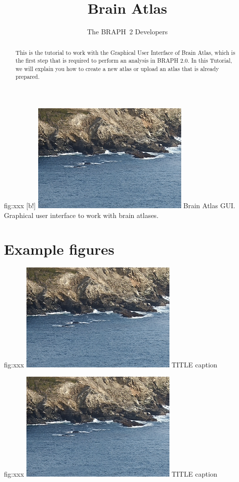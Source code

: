 \documentclass{tufte-handout}
\title{Brain Atlas}
\author[The BRAPH~2 Developers]{The BRAPH~2 Developers}
\begin{document}
\maketitle

	{fig:xxx}
	{
	[b!]
	\includegraphics{tut_ba/fig1.png}
	}
	{Brain Atlas GUI.}
	{
	Graphical user interface to work with brain atlases. 
	}
	
\begin{abstract}
\noindent
This is the tutorial to work with the Graphical User Interface of Brain Atlas, which is the first step that is required to perform an analysis in BRAPH 2.0. 
In this Tutorial, we will explain you how to create a new atlas or upload an atlas that is already prepared.
\end{abstract}

\clearpage
\section{Example figures}

	{fig:xxx}
	{\includegraphics{tut_ba/fig1.png}}
	{TITLE}
	{
	caption
	}

	{fig:xxx}
	{\includegraphics{tut_ba/fig1.png}}
	{TITLE}
	{
	caption
	}
\end{document}
